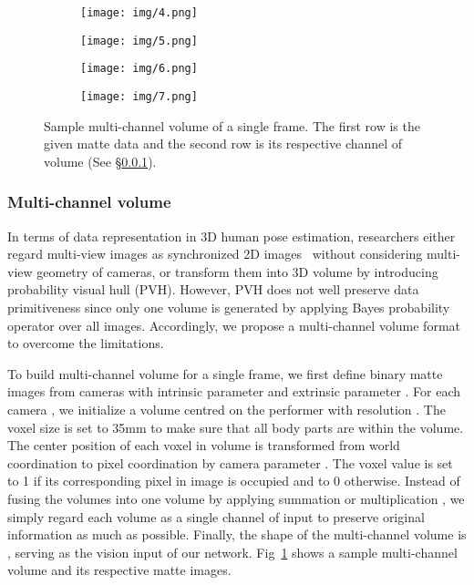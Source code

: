 \documentclass[10pt,twocolumn,letterpaper]{article}
\begin{document}
\begin{figure}
    \begin{subfigure}[b]{0.053\textwidth}
    \centering
        \texttt{[image: img/4.png]}
    \end{subfigure}
    \begin{subfigure}[b]{0.053\textwidth}
    \centering
        \texttt{[image: img/5.png]}
    \end{subfigure}
    \begin{subfigure}[b]{0.053\textwidth}
    \centering
        \texttt{[image: img/6.png]}
    \end{subfigure}
    \begin{subfigure}[b]{0.053\textwidth}
    \centering
        \texttt{[image: img/7.png]}
    \end{subfigure}
    \caption{Sample multi-channel volume of a single frame. The first row is the given matte data and the second row is its respective channel of volume (See \S\ref{sec:multi_c_v}). }
    \label{fig:volume}
    \vspace*{-14pt}
\end{figure}
\vspace{-0.3cm}
\subsubsection{Multi-channel volume}
\label{sec:multi_c_v}
In terms of data representation in 3D human pose estimation, researchers either regard multi-view images as synchronized 2D images~\cite{sun2018integral,nibali2018nu} without considering multi-view geometry of cameras, or transform them into 3D volume  \cite{trumble2017total,trumble2018deep} by introducing probability visual hull (PVH). However, PVH does not well preserve data primitiveness since only one volume is generated by applying Bayes probability operator over all images. Accordingly, we propose a multi-channel volume format to overcome the limitations. 

To build multi-channel volume for a single frame, we first define binary matte images  from  cameras with intrinsic parameter  and extrinsic parameter . For each camera , we initialize a volume  centred on the performer with resolution . The voxel size is set to 35mm to make sure that all body parts are within the volume. The center position  of each voxel in volume  is transformed from world coordination to pixel coordination by camera parameter . The voxel value is set to 1 if its corresponding pixel in image  is occupied and to 0 otherwise. Instead of fusing the  volumes into one volume by applying summation or multiplication \cite{trumble2017total,trumble2018deep} , we simply regard each volume as a single channel of input to preserve original information as much as possible. Finally, the shape of the multi-channel volume is , serving as the vision input of our network. Fig~\ref{fig:volume} shows a sample multi-channel volume and its respective matte images. 
\vspace{-0.3cm}
\end{document}
